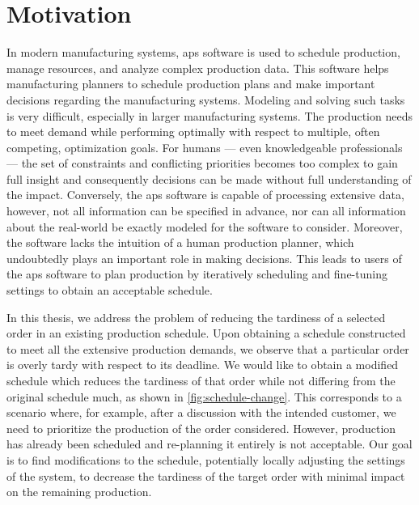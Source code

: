  \label{chap:introduction}

\section*{Motivation} \label{sec:introduction/motivation}

In modern manufacturing systems, \ac{aps} software is used to schedule production,
manage resources, and analyze complex production data.
This software helps manufacturing planners to schedule production plans
and make important decisions regarding the manufacturing systems.
Modeling and solving such tasks is very difficult, especially in larger manufacturing systems.
The production needs to meet demand while performing optimally with respect to multiple,
often competing, optimization goals.
For humans --- even knowledgeable professionals ---
the set of constraints and conflicting priorities becomes too complex to gain full insight
and consequently decisions can be made without full understanding of the impact.
Conversely, the \ac{aps} software is capable of processing extensive data,
however, not all information can be specified in advance,
nor can all information about the real-world be exactly modeled for the software to consider.
Moreover, the software lacks the intuition of a human production planner,
which undoubtedly plays an important role in making decisions.
This leads to users of the \ac{aps} software to plan production by iteratively
scheduling and fine-tuning settings to obtain an acceptable schedule.

In this thesis, we address the problem of reducing the tardiness
of a selected order in an existing production schedule.
Upon obtaining a schedule constructed to meet all the extensive production demands,
we observe that a particular order is overly tardy with respect to its deadline.
We would like to obtain a modified schedule which reduces the tardiness of that order
while not differing from the original schedule much,
as shown in \cref{fig:schedule-change}.
This corresponds to a scenario where, for example, after a discussion with the intended customer,
we need to prioritize the production of the order considered.
However, production has already been scheduled and re-planning it entirely is not acceptable.
Our goal is to find modifications to the schedule,
potentially locally adjusting the settings of the system,
to decrease the tardiness of the target order with minimal impact on the remaining production.

